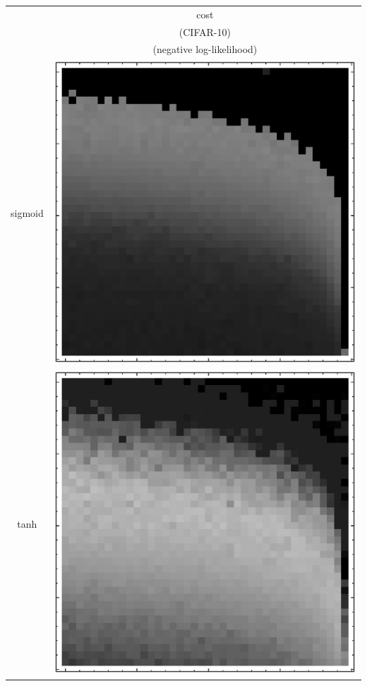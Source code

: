 \documentclass[10pt]{article}
\begin{document}
\begin{tabular}{|c|c|}
        \hline
        & {\LARGE cost} \\
        & (CIFAR-10) \\
        & (negative log-likelihood) \\
        \hline
sigmoid 
        & \includegraphics[scale=0.25]{plots/simple/LF-20S10S-20T10-CIFAR-3.eps} \\ \hline
tanh 
        & \includegraphics[scale=0.25]{plots/simple/LF-20T10T-20T10-CIFAR-3.eps} \\ \hline

\end{tabular}
\end{document}

